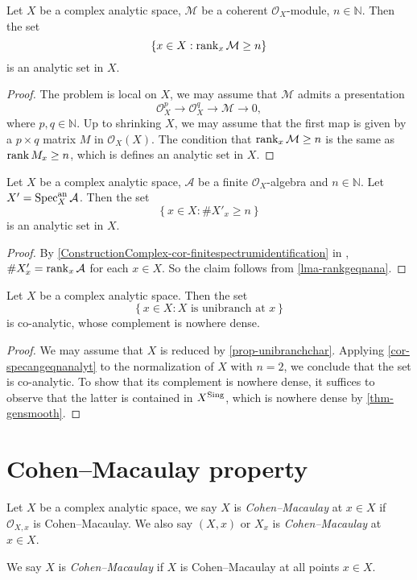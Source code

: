 \begin{lemma}\label{lma-rankgeqnana}
    Let $X$ be a complex analytic space, $\mathcal{M}$ be a coherent $\mathcal{O}_X$-module, $n\in \mathbb{N}$. Then the set
    \[
        \left\{x\in X: \rank_x \mathcal{M}\geq  n \right\}  
    \]
    is an analytic set in $X$.
\end{lemma}
\begin{proof}
    The problem is local on $X$, we may assume that $\mathcal{M}$ admits a presentation
    \[  
        \mathcal{O}_X^p\rightarrow \mathcal{O}_X^q\rightarrow \mathcal{M}\rightarrow 0,
    \]  
    where $p,q\in \mathbb{N}$. Up to shrinking $X$, we may assume that the first map is given by a $p\times q$ matrix $M$ in $\mathcal{O}_X(X)$. The condition that $\rank_x \mathcal{M}\geq  n$ is the same as $\rank M_x\geq n$, which is defines an analytic set in $X$.
\end{proof}
\begin{corollary}\label{cor-specangeqnanalyt}
    Let $X$ be a complex analytic space, $\mathcal{A}$ be a finite $\mathcal{O}_X$-algebra and $n\in \mathbb{N}$. Let $X'=\operatorname{Spec}_X^{\mathrm{an}}\mathcal{A}$.
    Then the set
    \[
        \left\{x\in X: \# X'_x \geq n \right\}  
    \]
    is an analytic set in $X$.
\end{corollary}
\begin{proof}
    By \cref{ConstructionComplex-cor-finitespectrumidentification} in , $\# X'_x=\rank_x \mathcal{A}$ for each $x\in X$. So the claim follows from \cref{lma-rankgeqnana}.
\end{proof}

\begin{corollary}
    Let $X$ be a complex analytic space. Then the set 
    \[
        \left\{ x\in X : X \text{ is unibranch at }x \right\}  
    \]
    is co-analytic, whose complement is nowhere dense.
\end{corollary}
\begin{proof}
    We may assume that $X$ is reduced by \cref{prop-unibranchchar}. 
    Applying \cref{cor-specangeqnanalyt} to the normalization of $X$ with $n=2$, we conclude that the set is co-analytic. To show that its complement is nowhere dense, it suffices to observe that the latter is contained in $X^{\operatorname{Sing}}$, which is nowhere dense by \cref{thm-gensmooth}.
\end{proof}

\section{Cohen--Macaulay property}
\begin{definition}
    Let $X$ be a complex analytic space, we say $X$ is \emph{Cohen--Macaulay} at $x\in X$ if $\mathcal{O}_{X,x}$ is Cohen--Macaulay. We also say $(X,x)$ or $X_x$ is \emph{Cohen--Macaulay} at $x\in X$.

    We say $X$ is \emph{Cohen--Macaulay} if $X$ is Cohen--Macaulay at all points $x\in X$. 
\end{definition}



